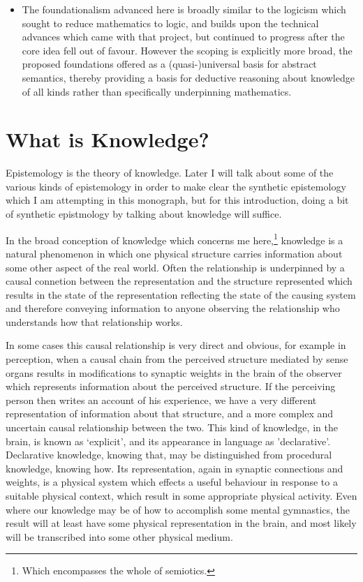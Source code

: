 \begin{itemize}
\item The foundationalism advanced here is broadly similar to the logicism which sought to reduce mathematics to logic, and builds upon the technical advances which came with that project, but continued to progress after the core idea fell out of favour.
  However the scoping is explicitly more broad, the proposed foundations offered as a (quasi-)universal basis for abstract semantics, thereby providing a basis for deductive reasoning about knowledge of all kinds rather than specifically underpinning mathematics.
  
\end{itemize}


\section{What is Knowledge?}

Epistemology is the theory of knowledge.
Later I will talk about some of the various kinds of epistemology in order to make clear the synthetic epistemology which I am attempting in this monograph, but for this introduction, doing a bit of synthetic epistmology by talking about knowledge will suffice.

In the broad conception of knowledge which concerns me here,\footnote{Which encompasses the whole of semiotics.} knowledge is a natural phenomenon in which one physical structure carries information about some other aspect of the real world.
Often the relationship is underpinned by a causal connetion between the representation and the structure represented which results in the state of the representation reflecting the state of the causing system and therefore conveying information to anyone observing the relationship who understands how that relationship works.

In some cases this causal relationship is very direct and obvious, for example in perception, when a causal chain from the perceived structure mediated by sense organs results in modifications to synaptic weights in the brain of the observer which represents information about the perceived structure.
If the perceiving person then writes an account of his experience, we have a very different representation of information about that structure, and a more complex and uncertain causal relationship between the two.
This kind of knowledge, in the brain, is known as `explicit', and its appearance in language as 'declarative'.
Declarative knowledge, knowing that, may be distinguished from procedural knowledge, knowing how.
Its representation, again in synaptic connections and weights, is a physical system which effects a useful behaviour in response to a suitable physical context, which result in some appropriate physical activity.
Even where our knowledge may be of how to accomplish some mental gymnastics, the result will at least have some physical representation in the brain, and most likely will be transcribed into some other physical medium.

